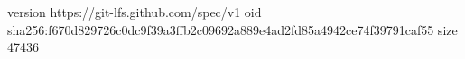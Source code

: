 version https://git-lfs.github.com/spec/v1
oid sha256:f670d829726c0dc9f39a3ffb2c09692a889e4ad2fd85a4942ce74f39791caf55
size 47436
